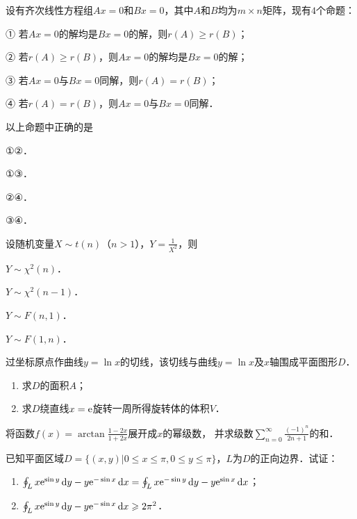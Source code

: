 \documentclass[plain,noanswer,medmath]{../../template/jnuexam}
\begin{document}
\begin{problem}
设有齐次线性方程组$Ax = 0$和$Bx = 0$，其中$A$和$B$均为$m \times n$矩阵，现有$4$个命题：\par
① 若$Ax = 0$的解均是$Bx = 0$的解，则$r(A) \ge r(B)$；\par
② 若$r(A) \ge r(B)$，则$Ax = 0$的解均是$Bx = 0$的解；\par
③ 若$Ax = 0$与$Bx = 0$同解，则$r(A) = r(B)$；\par
④ 若$r(A) = r(B)$，则$Ax = 0$与$Bx = 0$同解．\par
以上命题中正确的是\pickout{}
\begin{abcd}
\item ①②．
\item ①③．
\item ②④．
\item ③④．
\end{abcd}
\end{problem}


\begin{problem}
设随机变量$X\sim t(n)$（$n > 1$），$Y = \frac{1}{X^2}$，则\pickout{}
\begin{abcd}
\item $Y\sim \chi^2(n)$．
\item $Y\sim \chi^2(n - 1)$．
\item $Y\sim F(n,1)$．
\item $Y\sim F(1,n)$．
\end{abcd}
\end{problem}



\begin{problem}
过坐标原点作曲线$y = \ln x$的切线，该切线与曲线$y = \ln x$及$x$轴围成平面图形$D$．
\begin{enumerate}
\item 求$D$的面积$A$；
\item 求$D$绕直线$x = \mathrm{e}$旋转一周所得旋转体的体积$V$．
\end{enumerate}
\end{problem}



\begin{problem}
将函数$f(x) = \arctan \frac{1 - 2x}{1 + 2x}$展开成$x$的幂级数，
并求级数$\sum_{n = 0}^{\infty}\frac{(- 1)^n}{2n + 1}$的和．
\end{problem}



\begin{problem}
已知平面区域$D = \{(x,y)\left| 0 \le x \le \pi ,0 \le y \le \pi \right.\}$，$L$为$D$的正向边界．试证：
\begin{enumerate}
\item $\oint_L x\mathrm{e}^{\sin y} \mathop{}\!\mathrm{d} y - y\mathrm{e}^{- \sin x} \mathop{}\!\mathrm{d} x = \oint_L x\mathrm{e}^{- \sin y} \mathop{}\!\mathrm{d} y - y\mathrm{e}^{\sin x} \mathop{}\!\mathrm{d} x$；
\item $\oint_L x\mathrm{e}^{\sin y} \mathop{}\!\mathrm{d} y - y\mathrm{e}^{- \sin x} \mathop{}\!\mathrm{d} x \geqslant 2\pi^2$．
\end{enumerate}
\end{problem}
\end{document}
